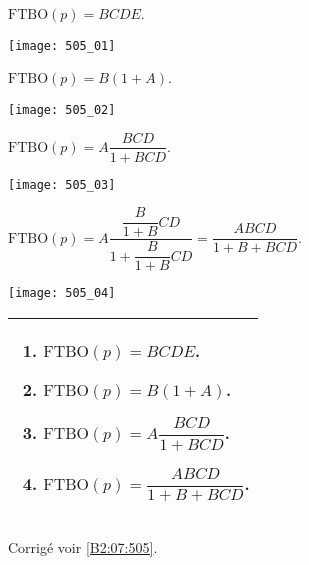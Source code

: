 \normaltrue \difficilefalse \tdifficilefalse
\correctionfalse


\setcounter{question}{0}

\ifcorrection
\else
{}
\fi


\ifprof 
$\text{FTBO}(p) = BCDE$.
\else
\begin{center}
\texttt{[image: 505\_01]}
\end{center}
\fi
 
\ifprof 
$\text{FTBO}(p) = B\left(1+A\right)$.
\else
\begin{center}
\texttt{[image: 505\_02]}
\end{center}
\fi

\ifprof 
$\text{FTBO}(p) = A \dfrac{BCD}{1+BCD}$.
\else
\begin{center}
\texttt{[image: 505\_03]}
\end{center}
\fi

\ifprof 
$\text{FTBO}(p) = A \dfrac{\dfrac{B}{1+B}CD}{1+\dfrac{B}{1+B}CD} = \dfrac{ABCD}{1+B+BCD}$.
\else
\begin{center}
\texttt{[image: 505\_04]}
\end{center}
\fi





 

\ifprof
\else
\footnotesize
\noindent
\begin{tabular}{|p{.95\linewidth}|}
\hline
\begin{enumerate}
\item $\text{FTBO}(p) = BCDE$.
\item $\text{FTBO}(p) = B\left(1+A\right)$.
\item $\text{FTBO}(p) = A \dfrac{BCD}{1+BCD}$.
\item $\text{FTBO}(p) = \dfrac{ABCD}{1+B+BCD}$.
\end{enumerate} \\ \hline
\end{tabular}
\normalsize

\begin{flushright}
\footnotesize{Corrigé  voir \ref{B2:07:505}.}
\end{flushright}%
\fi